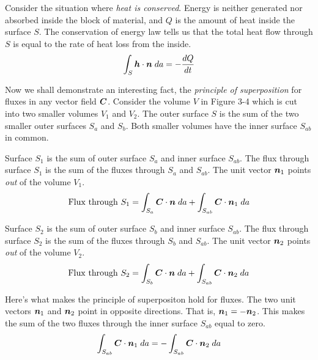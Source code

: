 Consider the situation where \emph{heat is conserved}.
Energy is neither generated nor absorbed inside the block of material, 
and $Q$ is the amount of heat inside the surface $S$.
The conservation of energy law tells us that the total heat flow through $S$
is equal to the rate of heat loss from the inside.
\begin{equation}
  \int_S \boldsymbol{h} \cdot \boldsymbol{n} \; da = - \frac{dQ}{dt}
\end{equation}

Now we shall demonstrate an interesting fact, the \emph{principle of superposition}
for fluxes in any vector field $\boldsymbol{C}$.
Consider the volume $V$ in Figure 3-4 which is cut into two smaller volumes $V_1$ and $V_2$.
The outer surface $S$ is the sum of the two smaller outer surfaces $S_a$ and $S_b$.
Both smaller volumes have the inner surface $S_{ab}$ in common.

Surface $S_1$ is the sum of outer surface $S_a$ and inner surface $S_{ab}$.
The flux through surface $S_1$ is the sum of the fluxes through $S_a$ and $S_{ab}$.
The unit vector $\boldsymbol{n}_1$ points \emph{out} of the volume $V_1$.
\begin{equation}
  \mathrm{Flux\ through\ }S_1 = 
  \int_{S_a} \boldsymbol{C} \cdot \boldsymbol{n} \; da + \int_{S_{ab}} \boldsymbol{C} \cdot \boldsymbol{n}_1 \; da
\end{equation}

Surface $S_2$ is the sum of outer surface $S_b$ and inner surface $S_{ab}$.
The flux through surface $S_2$ is the sum of the fluxes through $S_b$ and $S_{ab}$.
The unit vector $\boldsymbol{n}_2$ points \emph{out} of the volume $V_2$.
\begin{equation}
  \mathrm{Flux\ through\ }S_2 = 
  \int_{S_b} \boldsymbol{C} \cdot \boldsymbol{n} \; da + \int_{S_{ab}} \boldsymbol{C} \cdot \boldsymbol{n}_2 \; da
\end{equation}

Here's what makes the principle of superpositon hold for fluxes.
The two unit vectors $\boldsymbol{n}_1$ and $\boldsymbol{n}_2$ point in opposite directions.
That is, $\boldsymbol{n}_1 = -\boldsymbol{n}_2$.  This makes the sum of the two fluxes through
the inner surface $S_{ab}$ equal to zero.
\begin{equation}
  \int_{S_{ab}} \boldsymbol{C} \cdot \boldsymbol{n}_1 \; da = - \int_{S_{ab}} \boldsymbol{C} \cdot \boldsymbol{n}_2 \; da
\end{equation}
